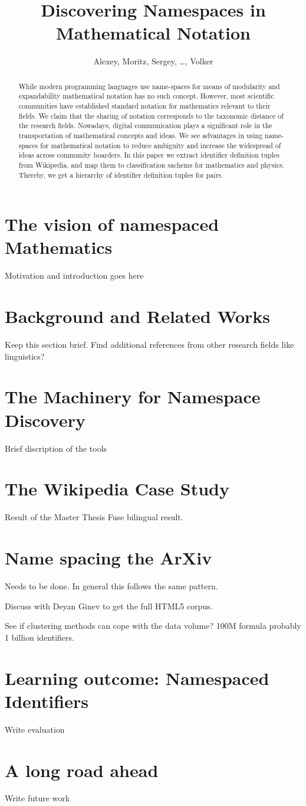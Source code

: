\documentclass[]{article}
\title{Discovering Namespaces in Mathematical Notation}
\author{Alexey, Moritz, Sergey, \dots , Volker}
\begin{document}
\maketitle

\begin{abstract}
While modern programming languages use name-spaces for means of modularity and expandability mathematical notation has no such concept.
However, most scientific communities have established standard notation for mathematics relevant to their fields.
We claim that the sharing of notation corresponds to the taxonomic distance of the research fields.
Nowadays, digital communication plays a significant role in the transportation of mathematical concepts and ideas.
We see advantages in using name-spaces for mathematical notation to reduce ambiguity and increase the widespread of ideas across community boarders.
In this paper we extract identifier definition tuples from Wikipedia, and map them to classification sachems for mathematics and physics. Thereby, we get a hierarchy of identifier definition tuples for pairs.
\end{abstract}

\section{The vision of namespaced Mathematics}
Motivation and introduction goes here
\section{Background and Related Works}
Keep this section brief. Find additional references from other research fields like linguistics?
\section{The Machinery for Namespace Discovery}
Brief discription of the tools
\section{The Wikipedia Case Study}
Result of the Master Thesis
Fuse bilingual result.
\section{Name spacing the ArXiv}
Needs to be done. In general this follows the same pattern.

Discuss with Deyan Ginev to get the full HTML5 corpus.

See if clustering methods can cope with the data volume? 100M formula probably 1 billion identifiers.

\section{Learning outcome: Namespaced Identifiers}
Write evaluation
\section{A long road ahead}
Write future work
\end{document}
